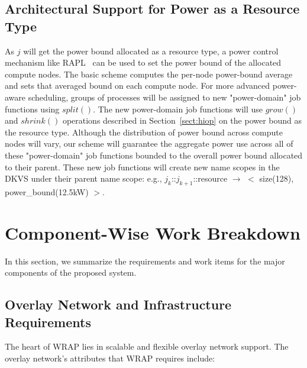 \documentclass[10pt]{article}
\begin{document}
\subsection{Architectural Support for Power as a Resource Type} 
As $j$ will get the power bound allocated as a resource type, 
a power control mechanism like RAPL~\cite{RountreeRAPL} can be used 
to set the power bound of the allocated compute nodes. 
The basic scheme computes the per-node power-bound average 
and sets that averaged bound on each compute node.
For more advanced power-aware scheduling, groups of processes will
be assigned to new "power-domain" job functions using $split()$. 
The new power-domain job functions will use $grow()$ and $shrink()$ 
operations described in Section~\ref{sect:hiop} 
on the power bound as the resource type.
Although the distribution of power bound across compute
nodes will vary, our scheme will guarantee the aggregate power use 
across all of these "power-domain" job functions bounded to the overall power bound 
allocated to their parent. 
These new job functions will create new name scopes 
in the DKVS under their parent name scope: 
e.g., $j_k$::$j_{k+1}$::resource $\rightarrow$ $<$ size(128), power\_bound(12.5kW) $>$.


\section{Component-Wise Work Breakdown}
In this section, we summarize the requirements and work items for 
the major components of the proposed system. 

\subsection{Overlay Network and Infrastructure Requirements}
The heart of WRAP lies in scalable and flexible overlay network support. 
The overlay network's attributes that WRAP requires include:  
\end{document}
